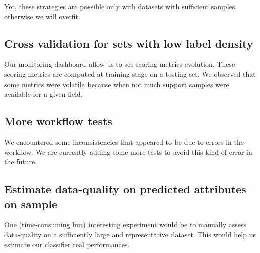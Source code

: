 Yet, these strategies are possible only with datasets with sufficient samples, otherwise we will overfit.

\subsection{Cross validation for sets with low label density}

Our monitoring dashboard allow us to see scoring metrics evolution. These scoring metrics are computed at training stage on a testing set. We observed that some metrics were volatile because when not much support samples were available for a given field.

\subsection{More workflow tests}
We encountered some inconsistencies that appeared to be due to errors in the workflow. We are currently adding some more tests to avoid this kind of error in the future.

\subsection{Estimate data-quality on predicted attributes on sample}
One (time-consuming but) interesting experiment would be to manually assess data-quality on a sufficiently large and representative dataset. This would help us estimate our classifier real performances.

